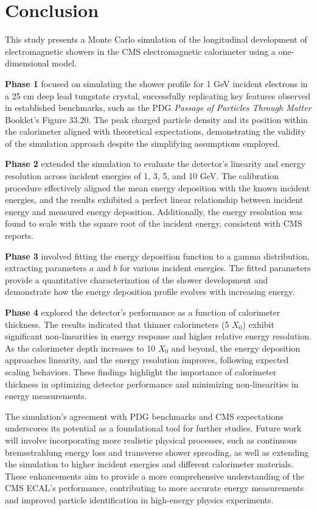 \documentclass[twocolumn]{aastex631}
\begin{document}
\section{Conclusion}\label{sec:conclusion}

This study presents a Monte Carlo simulation of the longitudinal development of electromagnetic showers in the CMS electromagnetic calorimeter using a one-dimensional model.

\textbf{Phase 1} focused on simulating the shower profile for 1 GeV incident electrons in a 25 cm deep lead tungstate crystal, successfully replicating key features observed in established benchmarks, such as the PDG \textit{Passage of Particles Through Matter} Booklet's Figure 33.20. The peak charged particle density and its position within the calorimeter aligned with theoretical expectations, demonstrating the validity of the simulation approach despite the simplifying assumptions employed.

\textbf{Phase 2} extended the simulation to evaluate the detector's linearity and energy resolution across incident energies of 1, 3, 5, and 10 GeV. The calibration procedure effectively aligned the mean energy deposition with the known incident energies, and the results exhibited a perfect linear relationship between incident energy and measured energy deposition. Additionally, the energy resolution was found to scale with the square root of the incident energy, consistent with CMS reports.

\textbf{Phase 3} involved fitting the energy deposition function to a gamma distribution, extracting parameters \(a\) and \(b\) for various incident energies. The fitted parameters provide a quantitative characterization of the shower development and demonstrate how the energy deposition profile evolves with increasing energy.

\textbf{Phase 4} explored the detector's performance as a function of calorimeter thickness. The results indicated that thinner calorimeters (5 \(X_0\)) exhibit significant non-linearities in energy response and higher relative energy resolution. As the calorimeter depth increases to 10 \(X_0\) and beyond, the energy deposition approaches linearity, and the energy resolution improves, following expected scaling behaviors. These findings highlight the importance of calorimeter thickness in optimizing detector performance and minimizing non-linearities in energy measurements.

The simulation's agreement with PDG benchmarks and CMS expectations underscores its potential as a foundational tool for further studies. Future work will involve incorporating more realistic physical processes, such as continuous bremsstrahlung energy loss and transverse shower spreading, as well as extending the simulation to higher incident energies and different calorimeter materials. These enhancements aim to provide a more comprehensive understanding of the CMS ECAL's performance, contributing to more accurate energy measurements and improved particle identification in high-energy physics experiments.
\end{document}
